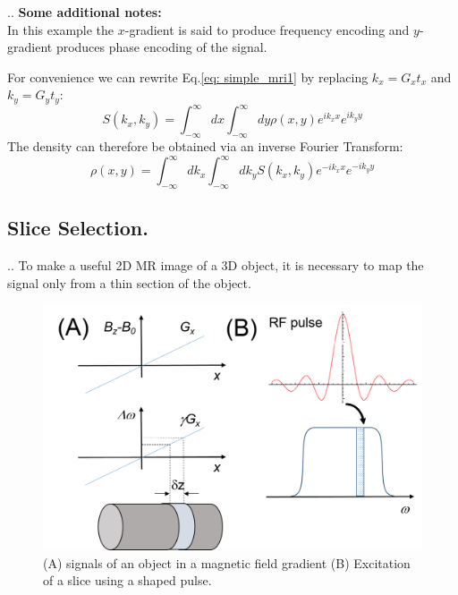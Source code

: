 \documentclass[handout]{beamer}
\begin{document}
\begin{frame}{\thesection.\thesubsection. \insertsubsection}
   \textbf{Some additional notes:} \\
   In this example the $x$-gradient is said to produce \alert{frequency encoding} and $y$-gradient produces \alert{phase encoding} of the signal.
   
   For convenience we can rewrite Eq.\ref{eq: simple_mri1} by replacing $k_x = G_x t_x$ and $k_y = G_y t_y$:
   \begin{equation}
      S(k_x, k_y)  = \int_{-\infty}^{\infty} dx \int_{-\infty}^{\infty} dy \rho(x,y)e^{i k_x x} e^{i k_y y}
   \end{equation}
   The density can therefore be obtained via an inverse Fourier Transform:
   \begin{equation}
     \rho(x,y)= \int_{-\infty}^{\infty} dk_x \int_{-\infty}^{\infty} dk_y  S(k_x, k_y) e^{-i k_x x} e^{-i k_y y}
   \end{equation}
   
\end{frame}

\subsection{Slice Selection.}
\begin{frame}{\thesection.\thesubsection. \insertsubsection}
  To make a useful 2D MR image of a 3D object, it is necessary to
  map the signal only from a thin section of the object.  
   \begin{figure}
  	\centering
  	\includegraphics[scale=0.5]{figures/slice_selection1.png}
  	\caption{(A) signals of an object in a magnetic field gradient (B) Excitation of a slice using a shaped pulse.}
  \end{figure}  
\end{frame}  
\end{document}
